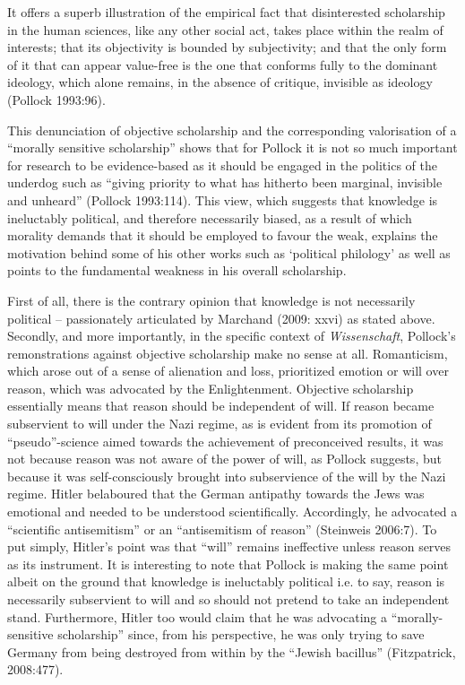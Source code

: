 \begin{myquote}
It offers a superb illustration of the empirical fact that disinterested scholarship in the human sciences, like any other social act, takes place within the realm of interests; that its objectivity is bounded by subjectivity; and that the only form of it that can appear value-free is the one that conforms fully to the dominant ideology, which alone remains, in the absence of critique, invisible as ideology
\hfill(Pollock 1993:96).
\end{myquote}
\medskip

This denunciation of objective scholarship and the corresponding valorisation of a “morally sensitive scholarship” shows that for Pollock it is not so much important for research to be  evidence-based as it should be engaged in the politics of the underdog such as “giving priority to what has hitherto been  marginal, invisible and unheard” (Pollock 1993:114). This view, which suggests that knowledge is ineluctably political, and  therefore necessarily biased, as a result of which morality demands that it should be employed to favour the weak, explains the motivation behind some of his other works such as ‘political philology’ as well as points to the fundamental weakness in his overall scholarship.
\vskip 2pt

First of all, there is the contrary opinion that knowledge is not necessarily political – passionately articulated by Marchand (2009: xxvi) as stated above. Secondly, and more importantly, in the specific context of {\sl Wissenschaft}, Pollock’s remonstrations against objective scholarship make no sense at all. Romanticism, which arose out of a sense of alienation and loss, prioritized emotion or will over reason, which was advocated by the Enlightenment. Objective scholarship essentially means that reason should be independent of will. If reason became subservient to will under the Nazi regime, as is evident from its promotion of “pseudo”-science aimed towards the achievement of preconceived results, it was not because reason was not aware of the power of will, as Pollock suggests, but because it was self-consciously brought into subservience of the will by the Nazi regime. Hitler belaboured that the German antipathy towards the Jews was emotional and needed to be understood scientifically. Accordingly, he advocated a “scientific antisemitism” or an “antisemitism of reason” (Steinweis 2006:7). To put simply, Hitler’s point was that “will” remains ineffective unless reason serves as its instrument. It is interesting to note that Pollock is making the same point albeit on the ground that knowledge is ineluctably political i.e. to say, reason is necessarily subservient to will and so should not pretend to take an independent stand. Furthermore, Hitler too would claim that he was advocating a “morally-sensitive scholarship” since, from his perspective, he was only trying to save Germany from being destroyed from within by the “Jewish bacillus” (Fitzpatrick, 2008:477).

